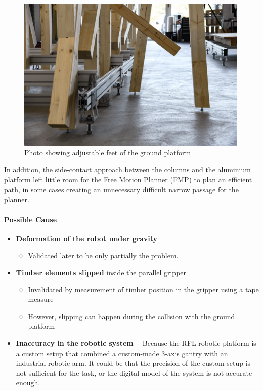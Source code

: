 \begin{figure}[!h]
    \centering
    \includegraphics[width=0.99\textwidth]{images/05/image77.jpg}
    \caption{Photo showing adjustable feet of the ground platform}
    \label{fig:adjustable-feet}
\end{figure}  

In addition, the side-contact approach between the columns and the aluminium platform left little room for the Free Motion Planner (FMP) to plan an efficient path, in some cases creating an unnecessary difficult narrow passage for the planner.

\paragraph{Possible Cause}

\begin{itemize}
    \item \textbf{Deformation of the robot under gravity}
    \begin{itemize}
        \item Validated later to be only partially the problem. 
    \end{itemize}
    \item \textbf{Timber elements slipped} inside the parallel gripper
    \begin{itemize}
        \item Invalidated by measurement of timber position in the gripper using a tape measure
        \item However, slipping can happen during the collision with the ground platform
    \end{itemize}
    \item \textbf{Inaccuracy in the robotic system -- }Because the RFL robotic platform is a custom setup that combined a custom-made 3-axis gantry with an industrial robotic arm. It could be that the precision of the custom setup is not sufficient for the task, or the digital model of the system is not accurate enough.
\end{itemize}

